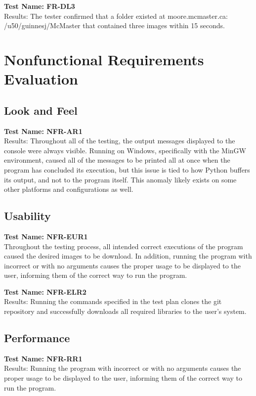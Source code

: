 \documentclass[12pt, titlepage]{article}
\begin{document}
\medskip
\noindent \textbf{Test Name: FR-DL3}\\
Results: The tester confirmed that a folder existed at moore.mcmaster.ca: /u50/guinnesj/McMaster that contained three images within 15 seconds.

\section{Nonfunctional Requirements Evaluation}

\subsection{Look and Feel}
\textbf{Test Name: NFR-AR1}\\
Results: Throughout all of the testing, the output messages displayed to the console were always visible. Running on Windows, specifically with the MinGW environment, caused all of the messages to be printed all at once when the program has concluded its execution, but this issue is tied to how Python buffers its output, and not to the program itself. This anomaly likely exists on some other platforms and configurations as well.

\subsection{Usability}
\textbf{Test Name: NFR-EUR1}\\
Throughout the testing process, all intended correct executions of the program caused the desired images to be download. In addition, running the program with incorrect or with no arguments causes the proper usage to be displayed to the user, informing them of the correct way to run the program.

\medskip
\noindent \textbf{Test Name: NFR-ELR2}\\
Results: Running the commands specified in the test plan clones the git repository and successfully downloads all required libraries to the user's system.
		
\subsection{Performance}
\textbf{Test Name: NFR-RR1}\\
Results: Running the program with incorrect or with no arguments causes the proper usage to be displayed to the user, informing them of the correct way to run the program.
\end{document}
